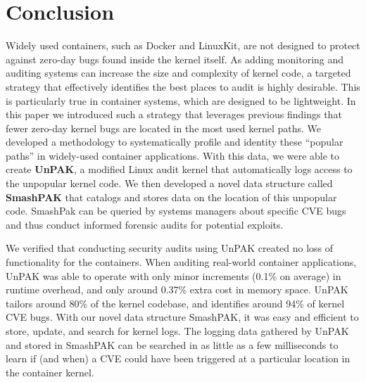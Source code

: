 \section{Conclusion}
\label{sec.conclusion}
Widely used containers, such as Docker and LinuxKit, are not designed to protect against zero-day bugs found inside the kernel itself. 
As adding monitoring and auditing systems can increase the size and complexity of kernel code, a targeted strategy that effectively identifies the best places to audit is highly desirable. 
This is particularly true in container systems, which are designed to be lightweight. 
In this paper we introduced such a strategy that leverages previous findings \cite{Lock-in-Pop} that fewer zero-day kernel bugs are located in the most used kernel paths. 
We developed a methodology to systematically profile and identity these ``popular paths'' in widely-used container applications. 
With this data, we were able to create \textbf{UnPAK}, a modified Linux audit kernel that automatically logs access to the unpopular kernel code. 
We then developed a novel data structure called \textbf{SmashPAK} that catalogs and stores data on the location of this unpopular code. 
SmashPak can be queried by systems managers about specific CVE bugs and thus conduct informed forensic audits for potential exploits. 

We verified that conducting security audits using UnPAK created no loss of functionality for the containers. When auditing real-world container applications, 
UnPAK was able to operate with only minor increments (0.1\% on average) in runtime overhead, and only around 0.37\% extra cost in memory space. 
UnPAK tailors around 80\% of the kernel codebase, and identifies around 94\% of kernel CVE bugs. 
With our novel data structure SmashPAK, it was easy and efficient to store, update, and search for kernel logs. 
The logging data gathered by UnPAK and stored in SmashPAK can be searched in as little as a few milliseconds to learn if (and when) a CVE could have been triggered at a particular location in the container kernel. 